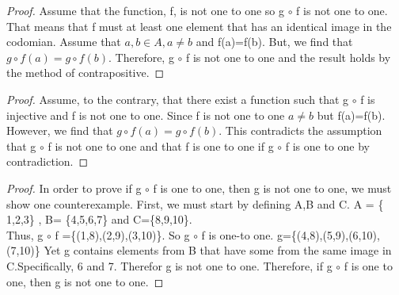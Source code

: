 \documentclass[12pt]{article}
\begin{document}
\begin{proof}
Assume that the function, f, is not one to one so g $\circ$ f is not one to one. That means that f must at least one element that has an identical image in the codomian. Assume that $a,b \in A, a \not = b$ and f(a)=f(b). But, we find that $g \circ f (a)=g \circ f (b)$. Therefore, g $\circ$ f is not one to one and the result holds by the method of contrapositive. 
\end{proof}

\begin{proof}
Assume, to the contrary, that there exist a function such that g $\circ$ f is injective and f is not one to one. Since f is not one to one $a \not = b$ but f(a)=f(b). However, we find that $g \circ f (a)=g \circ f (b)$. This contradicts the assumption that  g $\circ$ f is not one to one and that f is one to one if g $\circ$ f is one to one by contradiction. 
\end{proof}

\begin{proof}
In order to prove if g $\circ$ f is one to one, then g is not one to one, we must show one counterexample. First, we must start by defining A,B and C. A = \{ 1,2,3\} , B= \{4,5,6,7\} and C=\{8,9,10\}.\\
Thus, g $\circ$ f =\{(1,8),(2,9),(3,10)\}. So g $\circ$ f is one-to one. g=\{(4,8),(5,9),(6,10),(7,10)\} Yet g contains elements from B that have some from the same image in C.Specifically, 6 and 7. Therefor g is not one to one. Therefore, if g $\circ$ f is one to one, then g is not one to one. 
\end{proof}
\end{document}
